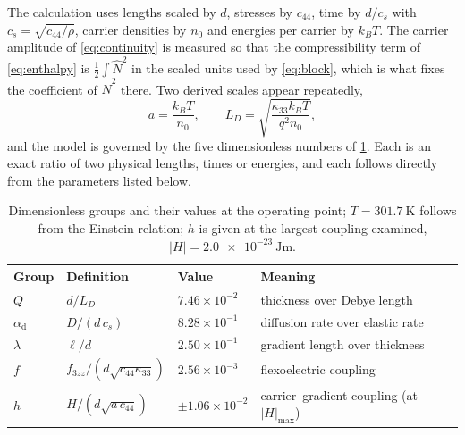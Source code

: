 The calculation uses lengths scaled by $d$, stresses by $c_{44}$, time by
$d/c_s$ with $c_s=\sqrt{c_{44}/\rho}$, carrier densities by $n_0$ and energies
per carrier by $k_BT$.  The carrier amplitude of \eqref{eq:continuity} is
measured so that the compressibility term of \eqref{eq:enthalpy} is
$\tfrac12\int\widehat N^{2}$ in the scaled units used by \eqref{eq:block}, which
is what fixes the coefficient of $\widehat N^{2}$ there.  Two derived scales appear repeatedly,
\begin{equation*}
a=\frac{k_BT}{n_0},\qquad L_D=\sqrt{\frac{\kappa_{33}k_BT}{q^2n_0}},
\end{equation*}
and the model is governed by the five dimensionless numbers of
\cref{tab:groups}.  Each is an exact ratio of two physical lengths, times or
energies, and each follows directly from the parameters listed below.

\begin{table}[t]
\centering
\caption{Dimensionless groups and their values at the operating point; $T=\SI{301.7}{\kelvin}$ follows from the Einstein relation; $h$ is given at the largest coupling examined, $|H|=\SI{2.0e-23}{\joule\metre}$.}
\label{tab:groups}
\begin{tabular}{@{}llll@{}}
\toprule
Group & Definition & Value & Meaning \\
\midrule
$Q$ & $d/L_D$ & $7.46\times10^{-2}$ & thickness over Debye length \\
$\alpha_{\mathrm{d}}$ & $D/(d\,c_s)$ & $8.28\times10^{-1}$ & diffusion rate over elastic rate \\
$\lambda$ & $\ell/d$ & $2.50\times10^{-1}$ & gradient length over thickness \\
$f$ & $f_{3zz}/(d\sqrt{c_{44}\kappa_{33}})$ & $2.56\times10^{-3}$ & flexoelectric coupling \\
$h$ & $H/(d\sqrt{a\,c_{44}})$ & $\pm1.06\times10^{-2}$ & carrier--gradient coupling (at $|H|_{\max}$) \\
\bottomrule
\end{tabular}
\end{table}

